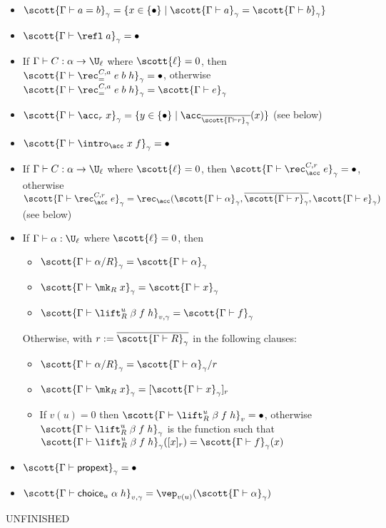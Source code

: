 \begin{itemize}
\item $\scott{\Gamma\vdash a=b}_\gamma=\{x\in\{\bullet\}\mid\scott{\Gamma\vdash a}_\gamma=\scott{\Gamma\vdash b}_\gamma\}$
\item $\scott{\Gamma\vdash \refl\;a}_\gamma=\bullet$
\item If $\Gamma\vdash C:\alpha\to\U_\ell$ where $\scott{\ell}=0$, then $\scott{\Gamma\vdash\rec_=^{C,a}\;e\;b\;h}_\gamma=\bullet$, otherwise $\scott{\Gamma\vdash\rec_=^{C,a}\;e\;b\;h}_\gamma=\scott{\Gamma\vdash e}_\gamma$
\item $\scott{\Gamma\vdash\acc_r\;x}_\gamma=\{y\in\{\bullet\}\mid\acc_{\overline{\scott{\Gamma\vdash r}_\gamma}}(x)\}$ (see below)
\item $\scott{\Gamma\vdash\intro_\acc\;x\;f}_\gamma=\bullet$
\item If $\Gamma\vdash C:\alpha\to\U_\ell$ where $\scott{\ell}=0$, then $\scott{\Gamma\vdash\rec_\acc^{C,r}\;e}_\gamma=\bullet$, otherwise $\scott{\Gamma\vdash\rec_\acc^{C,r}\;e}_\gamma=\rec_\acc(\scott{\Gamma\vdash\alpha}_\gamma,\overline{\scott{\Gamma\vdash r}_\gamma},\scott{\Gamma\vdash e}_\gamma)$ (see below)
\item If $\Gamma\vdash\alpha:\U_\ell$ where $\scott{\ell}=0$, then
\begin{itemize}
\item $\scott{\Gamma\vdash\alpha/R}_\gamma=\scott{\Gamma\vdash\alpha}_\gamma$
\item $\scott{\Gamma\vdash\mk_R\;x}_\gamma=\scott{\Gamma\vdash x}_\gamma$
\item $\scott{\Gamma\vdash\lift^u_R\;\beta\;f\;h}_{v,\gamma}=\scott{\Gamma\vdash f}_\gamma$
\end{itemize}
Otherwise, with $r:=\overline{\scott{\Gamma\vdash R}_\gamma}$ in the following clauses:
\begin{itemize}
\item $\scott{\Gamma\vdash\alpha/R}_\gamma=\scott{\Gamma\vdash\alpha}_\gamma/r$
\item $\scott{\Gamma\vdash\mk_R\;x}_\gamma=[\scott{\Gamma\vdash x}_\gamma]_r$
\item If $v(u)=0$ then $\scott{\Gamma\vdash\lift^u_R\;\beta\;f\;h}_v=\bullet$, otherwise $\scott{\Gamma\vdash\lift^u_R\;\beta\;f\;h}_\gamma$ is the function such that $\scott{\Gamma\vdash\lift^u_R\;\beta\;f\;h}_\gamma([x]_r)=\scott{\Gamma\vdash f}_\gamma(x)$
\end{itemize}
\item $\scott{\Gamma\vdash\mathsf{propext}}_\gamma=\bullet$
\item $\scott{\Gamma\vdash\mathsf{choice}_u\;\alpha\;h}_{v,\gamma}=\vep_{v(u)}(\scott{\Gamma\vdash\alpha}_\gamma)$

\end{itemize}
UNFINISHED

